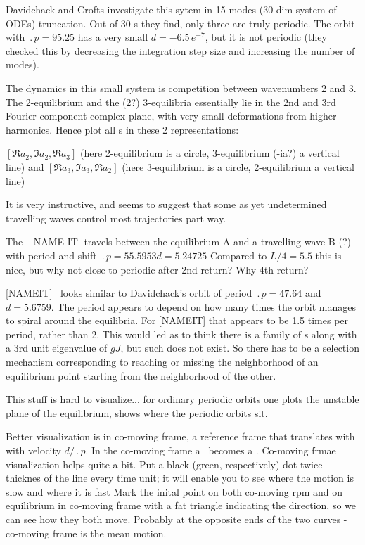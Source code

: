 %
Davidchack and Crofts 
investigate this sytem in 15 modes (30-dim system of ODEs) truncation.
Out of 30 \rpo s they
find,  only three are truly periodic.  The orbit
with $\period{p} = 95.25$ has a very small
$d = -6.5\,e^{-7}$, but it is not periodic 
(they
checked this by decreasing the integration step size and increasing the
number of modes).

The dynamics in this small system is competition between wavenumbers
2 and 3. The 2-equilibrium and the (2?) 3-equilibria essentially lie in
the 2nd and 3rd Fourier component complex plane, with very
small deformations from higher harmonics.
Hence plot all \rpo s in these 2 representations:

$[ \Re a_2, \Im a_2, \Re a_3 ]$
(here 2-equilibrium is a circle, 3-equilibrium (-ia?) a vertical line)
 and
$[ \Re a_3, \Im a_3, \Re a_2 ]$
(here 3-equilibrium is a circle, 2-equilibrium a vertical line)

It is very instructive, and seems to suggest that some as yet
undetermined travelling waves control most trajectories part way.

The \rpo\ [NAME IT] travels between the equilibrium A and a
travelling wave B (?) 
with period and shift
$\period{p}=55.5953 d=5.24725$
Compared to $L/4 = 5.5$
this is nice, but why not close to periodic after 2nd return? Why 4th return?

[NAMEIT] \rpo\ looks similar to Davidchack's  orbit
of period 
$\period{p}=47.64$ and $d=5.6759$. The period appears to depend on how
many times the orbit manages to spiral around the equilibria.
For [NAMEIT] that appears to be
1.5 times per period, rather than 2. This would led as
to
think there is a family of \rpo s along with a 3rd unit eigenvalue of
$gJ$,
but such does not exist.
So there has to be a selection mechanism corresponding to
reaching or missing the neighborhood of an equilibrium point starting from
the neighborhood of the other. 

This stuff is hard to visualize... for ordinary periodic orbits one
plots the unstable plane of the equilibrium, shows where the periodic
orbits sit.

Better visualization is in co-moving frame, {\ie} 
a reference frame that translates with with velocity $d/\period{p}$.
In the co-moving frame a \rpo\ becomes
a \po.
Co-moving frmae visualization helps quite a bit. Put a black (green, respectively) dot
twice thicknes of the line every time unit; it will enable you to see
where the motion is slow and where it is fast
Mark the inital point on both
co-moving rpm and on equilibrium in co-moving frame with a fat triangle
indicating the direction, so we can see how they both move. Probably at the
opposite ends of the two curves - co-moving frame is the mean motion.

